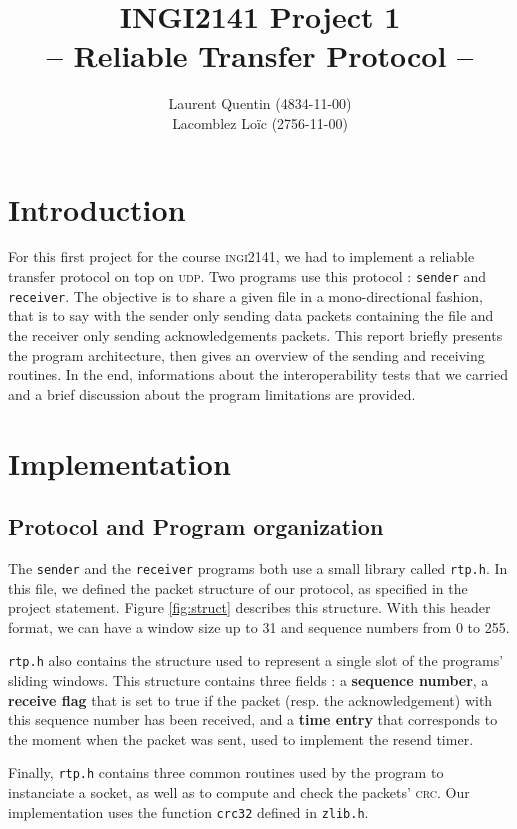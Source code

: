 \documentclass[11pt,a4paper,titlepage]{article}
\title{INGI2141 Project 1\\-- Reliable Transfer Protocol --}
\author{Laurent Quentin (4834-11-00)\\Lacomblez Loïc (2756-11-00)}
\begin{document}
\maketitle

\section*{Introduction}
For this first project for the course \textsc{ingi}2141, we had to implement a reliable transfer protocol on top on \textsc{udp}. Two programs use this protocol : \texttt{sender} and \texttt{receiver}. The objective is to share a given file in a mono-directional fashion, that is to say with the sender only sending data packets containing the file and the receiver only sending acknowledgements packets. This report briefly presents the program architecture, then gives an overview of the sending and receiving routines. In the end, informations about the interoperability tests that we carried and a brief discussion about the program limitations are provided.

\section{Implementation}


\subsection{Protocol and Program organization}
The \texttt{sender} and the \texttt{receiver} programs both use a small library called \texttt{rtp.h}. In this file, we defined the packet structure of our protocol, as specified in the project statement. Figure \ref{fig:struct} describes this structure. With this header format, we can have a window size up to 31 and sequence numbers from 0 to 255.

\texttt{rtp.h} also contains the structure used to represent a single slot of the programs' sliding windows. This structure contains three fields : a \textbf{sequence number}, a \textbf{receive flag} that is set to true if the packet (resp. the acknowledgement) with this sequence number has been received, and a \textbf{time entry} that corresponds to the moment when the packet was sent, used to implement the resend timer.

Finally, \texttt{rtp.h} contains three common routines used by the program to instanciate a socket, as well as to compute and check the packets' \textsc{crc}. Our implementation uses the function \texttt{crc32} defined in \texttt{zlib.h}.
\end{document}
